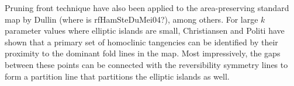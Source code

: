 {Pruning front technique have also been applied to the area-preserving
standard map by Dullin \etal(where is rf{HamSteDuMei04}?), among others. For large
$k$ parameter values where elliptic islands are small, Christiansen and
Politi have shown that a primary set of homoclinic
tangencies can be identified by their proximity to the dominant fold
lines in the map. Most impressively, the gaps between these points can be
connected with the reversibility symmetry lines to form a partition
line that partitions the elliptic islands as
well.
} %


\RemarksEnd

